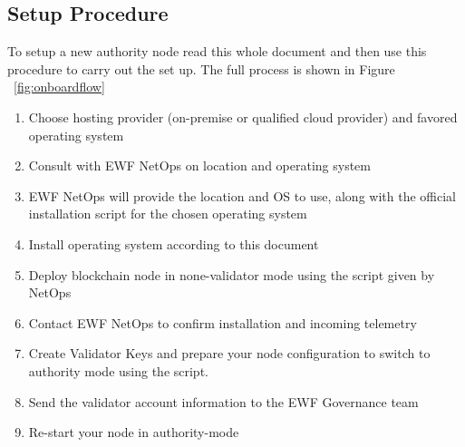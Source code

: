
\subsection{Setup Procedure}

To setup a new authority node read this whole document and then use this procedure to carry out the set up. The full process is shown in Figure ~\ref{fig:onboardflow}

\begin{enumerate}
    \item Choose hosting provider (on-premise or qualified cloud provider) and favored operating system
    \item Consult with EWF NetOps on location and operating system
    \item EWF NetOps will provide the location and OS to use, along with the official installation script for the chosen operating system
    \item Install operating system according to this document
    \item Deploy blockchain node in none-validator mode using the script given by NetOps 
    \item Contact EWF NetOps to confirm installation and incoming telemetry
    \item Create Validator Keys and prepare your node configuration to switch to authority mode using the script.
    \item Send the validator account information to the EWF Governance team
    \item Re-start your node in authority-mode
\end{enumerate}

